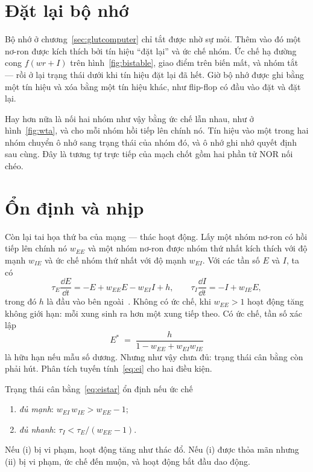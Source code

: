 \section{Đặt lại bộ nhớ}

Bộ nhớ ở chương~\ref{sec:glutcomputer} chỉ tắt được nhờ sự mỏi. Thêm vào đó một nơ-ron  được kích thích bởi tín hiệu ``đặt lại'' và ức chế nhóm. Ức chế hạ đường cong $f(wr+I)$ trên hình~\ref{fig:bistable}, giao điểm trên biến mất, và nhóm tắt --- rồi ở lại trạng thái dưới khi tín hiệu đặt lại đã hết. Giờ bộ nhớ được ghi bằng một tín hiệu và xóa bằng một tín hiệu khác, như flip-flop có đầu vào đặt và đặt lại.

Hay hơn nữa là nối hai nhóm như vậy bằng ức chế lẫn nhau, như ở hình~\ref{fig:wta}, và cho mỗi nhóm hồi tiếp lên chính nó. Tín hiệu vào một trong hai nhóm chuyển ô nhớ sang trạng thái của nhóm đó, và ô nhớ ghi nhớ quyết định sau cùng. Đây là tương tự trực tiếp của mạch chốt gồm hai phần tử NOR nối chéo.

\section{Ổn định và nhịp}

Còn lại tai họa thứ ba của mạng  --- thác hoạt động. Lấy một nhóm nơ-ron  có hồi tiếp lên chính nó $w_{EE}$ và một nhóm nơ-ron  được nhóm thứ nhất kích thích với độ mạnh $w_{IE}$ và ức chế nhóm thứ nhất với độ mạnh $w_{EI}$. Với các tần số $E$ và $I$, ta có
\begin{equation}
\tau_E\frac{\dd E}{\dd t} = -E + w_{EE}E - w_{EI}I + h, \qquad
\tau_I\frac{\dd I}{\dd t} = -I + w_{IE}E ,
\label{eq:ei}
\end{equation}
trong đó $h$ là đầu vào bên ngoài~\cite{WilsonCowan1972}. Không có ức chế, khi $w_{EE}>1$ hoạt động tăng không giới hạn: mỗi xung sinh ra hơn một xung tiếp theo. Có ức chế, tần số xác lập
\begin{equation}
E^* \;=\; \frac{h}{1-w_{EE}+w_{EI}w_{IE}}
\label{eq:eistar}
\end{equation}
là hữu hạn nếu mẫu số dương. Nhưng như vậy chưa đủ: trạng thái cân bằng còn phải hút. Phân tích tuyến tính~\eqref{eq:ei} cho hai điều kiện.

\begin{keyblock}
\begin{proposition}
\label{prop:ei}
Trạng thái cân bằng~\eqref{eq:eistar} ổn định nếu ức chế
\begin{enumerate}
\item[(i)] \emph{đủ mạnh}: $w_{EI}\,w_{IE} > w_{EE}-1$;
\item[(ii)] \emph{đủ nhanh}: $\tau_I < \tau_E/(w_{EE}-1)$.
\end{enumerate}
Nếu (i) bị vi phạm, hoạt động tăng như thác đổ. Nếu (i) được thỏa mãn nhưng (ii) bị vi phạm, ức chế đến muộn, và hoạt động bắt đầu dao động.
\end{proposition}
\end{keyblock}


